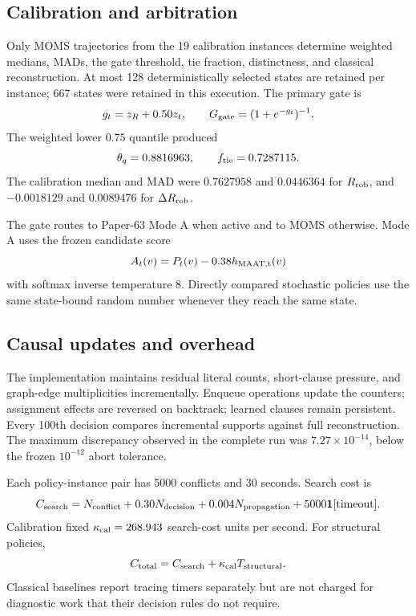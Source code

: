 \documentclass[11pt,a4paper]{article}
\newcommand{\Rrob}{R_{\rm rob}}
\newcommand{\Ggate}{G_{\rm gate}}
\begin{document}
\subsection{Calibration and arbitration}

Only MOMS trajectories from the 19 calibration instances determine weighted
medians, MADs, the gate threshold, tie fraction, distinctness, and classical
reconstruction.  At most 128 deterministically selected states are retained
per instance; 667 states were retained in this execution.  The primary gate is
\begin{equation}
g_t=z_R+0.50z_t,\qquad \Ggate=(1+e^{-g_t})^{-1}.
\end{equation}
The weighted lower $0.75$ quantile produced
\begin{equation}
\theta_q=0.8816963,\qquad f_{\rm tie}=0.7287115.
\end{equation}
The calibration median and MAD were $0.7627958$ and $0.0446364$ for
$\Rrob$, and $-0.0018129$ and $0.0089476$ for $\Delta\Rrob$.

The gate routes to Paper-63 Mode A when active and to MOMS otherwise.  Mode A
uses the frozen candidate score
\begin{equation}
A_t(v)=P_t(v)-0.38h_{\rm MAAT,t}(v)
\end{equation}
with softmax inverse temperature $8$.  Directly compared stochastic policies
use the same state-bound random number whenever they reach the same state.

\subsection{Causal updates and overhead}

The implementation maintains residual literal counts, short-clause pressure,
and graph-edge multiplicities incrementally.  Enqueue operations update the
counters; assignment effects are reversed on backtrack; learned clauses remain
persistent.  Every 100th decision compares incremental supports against full
reconstruction.  The maximum discrepancy observed in the complete run was
$7.27\times10^{-14}$, below the frozen $10^{-12}$ abort tolerance.

Each policy-instance pair has 5000 conflicts and 30 seconds.  Search cost is
\begin{equation}
C_{\rm search}=N_{\rm conflict}+0.30N_{\rm decision}
+0.004N_{\rm propagation}+5000\mathbf1[\mathrm{timeout}].
\end{equation}
Calibration fixed $\kappa_{\rm cal}=268.943$ search-cost units per second.
For structural policies,
\begin{equation}
C_{\rm total}=C_{\rm search}+\kappa_{\rm cal}T_{\rm structural}.
\end{equation}
Classical baselines report tracing timers separately but are not charged for
diagnostic work that their decision rules do not require.
\end{document}
